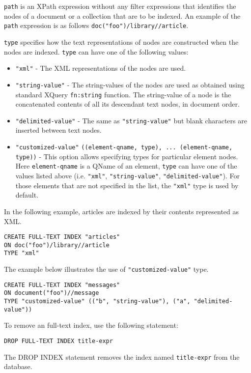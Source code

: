 \documentclass[a4paper,12pt]{article}
\begin{document}
\verb!path! is an XPath expression without any filter expressions that identifies the nodes of a document or a collection that are to be indexed. An example of the \verb!path! expression is as follows \verb!doc("foo")/library//article!.

\verb!type! specifies how the text representations of nodes are constructed when the nodes are indexed. \verb!type! can have one of the following values:
\begin{itemize}
\item \verb!"xml"! - The XML representations of the nodes are used.
\item \verb!"string-value"! - The string-values of the nodes are used as obtained using standard XQuery \verb!fn:string! function. The string-value of a node is the concatenated contents of all its descendant text nodes, in document order.
\item \verb!"delimited-value"! - The same as \verb!"string-value"! but blank characters are inserted between  text nodes.
\item \verb!"customized-value"! \verb!((element-qname, type), ... (element-qname, type))! - This option allows specifying  types for particular element nodes. Here \verb!element-qname! is a QName of an element, \verb!type! can have one of the values listed above (i.e. \verb!"xml"!, \verb!"string-value"!, \verb!"delimited-value"!). For those elements that are not specified in the list, the \verb!"xml"! type is used by default.
\end{itemize}

In the following example, articles are indexed by their contents represented as XML.

\begin{verbatim}
CREATE FULL-TEXT INDEX "articles"
ON doc("foo")/library//article
TYPE "xml"
\end{verbatim}

The example below illustrates the use of \verb!"customized-value"! type.
\begin{verbatim}
CREATE FULL-TEXT INDEX "messages"
ON document("foo")//message
TYPE "customized-value" (("b", "string-value"), ("a", "delimited-value"))
\end{verbatim}

To remove an full-text index, use the following statement:
\begin{verbatim}
DROP FULL-TEXT INDEX title-expr
\end{verbatim}

The DROP INDEX statement removes the index named \verb!title-expr! from the database.
\end{document}
